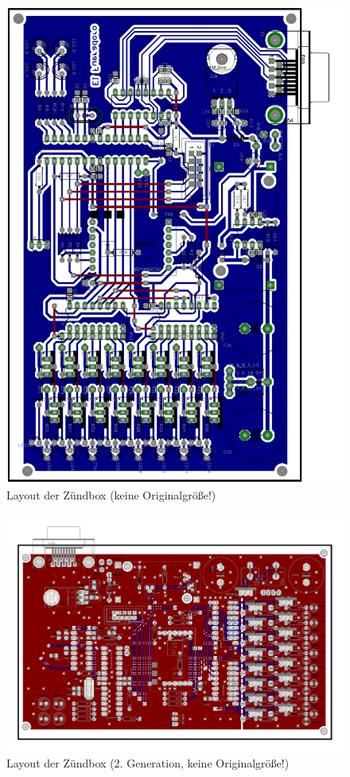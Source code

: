 \documentclass[paper=a4, parskip, numbers=noenddot, toc=listof, headsepline]{scrbook}
\begin{document}
		 \begin{figure}
			 \centering
			 \includegraphics[height=.95\textheight,keepaspectratio]{Bilder/Zuendboxlayout}
			 \caption{Layout der Zündbox (keine Originalgröße!)}
			 \label{fig:zuendboxlayout}
		 \end{figure}

		 \begin{figure}
			 \centering
			 \includegraphics[angle=90, height=.95\textheight,keepaspectratio]{Bilder/Zuendboxlayout2}
			 \caption{Layout der Zündbox (2. Generation, keine Originalgröße!)}
			 \label{fig:zuendbox2layout}
		 \end{figure}
\end{document}
